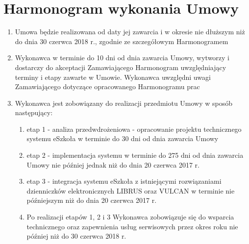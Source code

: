 \documentclass{article}
\begin{document}
\section{Harmonogram wykonania Umowy}
\begin{enumerate}
    \item Umowa będzie realizowana od daty jej zawarcia i w okresie nie dłuższym niż do dnia 30 czerwca 2018 r., zgodnie ze szczegółowym Harmonogramem
    \item Wykonawca w terminie do 10 dni od dnia zawarcia Umowy, wytworzy i dostarczy do akceptacji Zamawiającego Harmonogram uwzględniający terminy i etapy zawarte w Umowie. Wykonawca uwzględni uwagi Zamawiającego dotyczące opracowanego Harmonogramu prac
    \item Wykonawca jest zobowiązany do realizacji przedmiotu Umowy w sposób następujący:
    \begin{enumerate}
        \item etap 1 - analiza przedwdrożeniowa - opracowanie projektu technicznego systemu eSzkoła w terminie do 30 dni od dnia zawarcia Umowy
        \item etap 2 - implementacja systemu w terminie do 275 dni od dnia zawarcia      Umowy nie później jednak niż do dnia 20 czerwca 2017 r.
        \item etap 3 - integracja systemu eSzkoła z istniejącymi rozwiązaniami dzienniczków elektronicznych LIBRUS oraz VULCAN w terminie nie późniejszym niż do dnia 20 czerwca 2017 r.
        \item Po realizacji etapów 1, 2 i 3 Wykonawca zobowiązuje się do wsparcia technicznego oraz zapewnienia usług serwisowych przez okres roku nie później niż do 30 czerwca 2018 r.
    \end{enumerate}
\end{enumerate}

\end{document}
